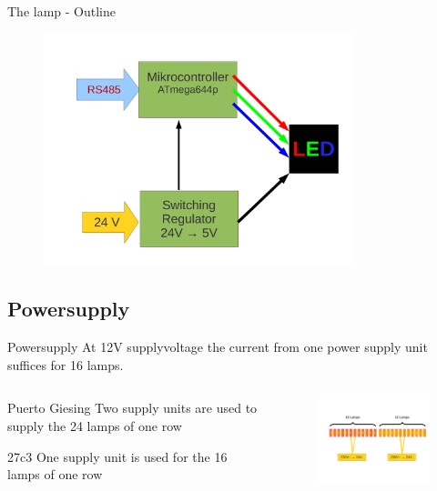 \documentclass{beamer}
\begin{document}
  \begin{frame}{The lamp - Outline}
    \begin{figure}
    \begin{center}
    \includegraphics[width=9cm]{bilder/led_12v_rs485.pdf}
    \end{center}
    \end{figure}
  \end{frame}
\subsection{Powersupply}
  \begin{frame}{Powersupply}
  At 12V supplyvoltage the current from one power supply unit suffices for 16 lamps.
  \begin{columns}
    \begin{column}{4cm}
     \begin{block}{ Puerto Giesing}
     Two supply units are used to supply the 24 lamps of one row
     \end{block}
     \begin{block}{27c3}
     One supply unit is used for the 16 lamps of one row
     \end{block}
    \end{column}
    \begin{column}{7cm}
    \begin{figure}
    \includegraphics[width=7cm, clip, trim= 2.5cm 4.6cm 0.5cm 4cm]{bilder/12lampen.pdf}
    \end{figure}
    \end{column}
  \end{columns}
  \end{frame}
\end{document}
